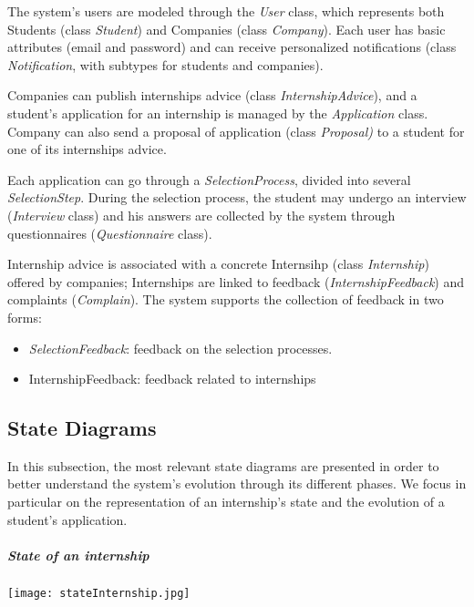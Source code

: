 			The system's users are modeled through the \textit{User} class, which represents both Students (class \textit{Student}) and Companies (class \textit{Company}). Each user has basic attributes (email and password) and can receive personalized notifications (class \textit{Notification}, with subtypes for students and companies).
			
			Companies can publish internships advice (class \textit{InternshipAdvice}), and a student's application for an internship is managed by the \textit{Application} class. Company can also send a proposal of application (class \textit{Proposal)} to a student for one of its internships advice.
			
			Each application can go through a \textit{SelectionProcess}, divided into several \textit{SelectionStep}. During the selection process, the student may undergo an interview (\textit{Interview} class) and his answers are collected by the system through questionnaires (\textit{Questionnaire} class).
			
			Internship advice is associated with a concrete Internsihp (class \textit{Internship}) offered by companies; Internships are linked to feedback (\textit{InternshipFeedback}) and complaints (\textit{Complain}). 
			The system supports the collection of feedback in two forms:
			\begin{itemize}
				\item \textit{SelectionFeedback}: feedback on the selection processes.
				\item {InternshipFeedback}: feedback related to internships
			
			\end{itemize}
			
			
			
			
			
			
			
			
			
			\subsection{State Diagrams}
				In this subsection, the most relevant state diagrams are presented in order to better understand the system's evolution through its different phases. We focus in particular on the representation of an internship's state and the evolution of a student's application.
				
				\subparagraph{State of an internship}
					\begin{center}
						\texttt{[image: stateInternship.jpg]}
					\end{center}
					
